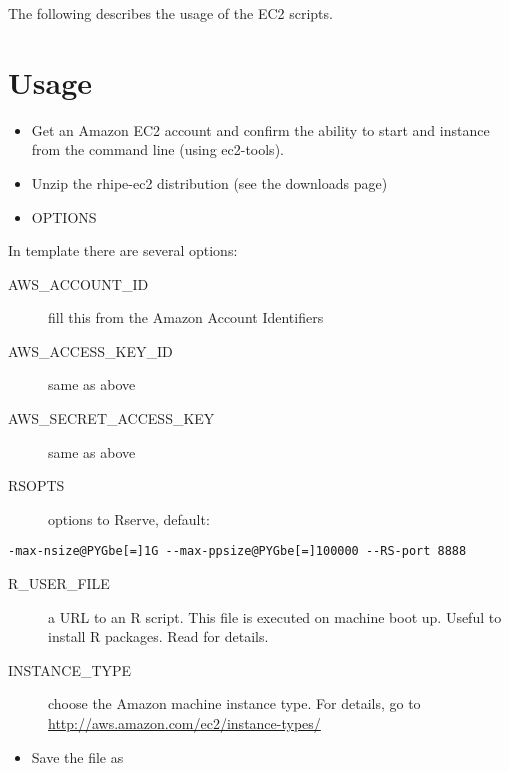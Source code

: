 \documentclass[letterpaper,10pt,english]{manual}
\begin{document}
The following describes the usage of the EC2 scripts.


\section{Usage}
\begin{itemize}
\item {} 
Get an Amazon EC2 account and confirm the ability to start and instance from the command line (using ec2-tools).

\item {} 
Unzip the rhipe-ec2 distribution (see the downloads page)

\item {} 
OPTIONS

\end{itemize}

In  template there are several options:
\begin{description}
\item[AWS\_ACCOUNT\_ID]
fill this from the Amazon Account Identifiers

\item[AWS\_ACCESS\_KEY\_ID]
same as above

\item[AWS\_SECRET\_ACCESS\_KEY]
same as above

\item[RSOPTS]
options to Rserve, default:

\end{description}

\begin{Verbatim}[commandchars=@\[\]]
-max-nsize@PYGbe[=]1G --max-ppsize@PYGbe[=]100000 --RS-port 8888
\end{Verbatim}
\begin{description}
\item[R\_USER\_FILE]
a URL to an R script. This file is executed on machine boot up. Useful to install R packages. Read  for details.

\item[INSTANCE\_TYPE]
choose the Amazon machine instance type. For details, go to
\href{http://aws.amazon.com/ec2/instance-types/}{http://aws.amazon.com/ec2/instance-types/}

\end{description}
\begin{itemize}
\item {} 
Save the file as 

\end{itemize}
\end{document}
